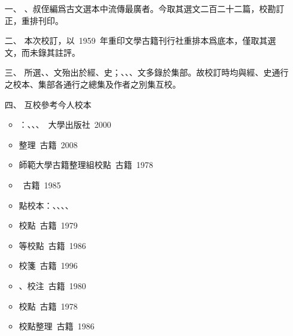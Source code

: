 \begin{enumerate}
    \item[一、] 、叔侄編爲古文選本中流傳最廣者。今取其選文二百二十二篇，校勘訂正，重排刊印。
    \item[二、] 本次校訂，以\ 1959\ 年重印文學古籍刊行社重排本爲底本，僅取其選文，而未錄其註評。
    \item[三、] 所選、、文殆出於經、史；、、、文多錄於集部。故校訂時均與經、史通行之校本、集部各通行之總集及作者之別集互校。
    \item[四、] 互校參考今人校本
    \begin{itemize}
        \item {}：、、、\ {\small {}大學出版社\ 2000}
        \item {}整理\ {\small {}古籍\ 2008}
        \item {}師範大學古籍整理組校點\ {\small {}古籍\ 1978}
        \item {}\ {\small {}古籍\ 1985}
        \item {}點校本：、、、、
        \item {}校點\ {\small {}古籍\ 1979}
        \item {}等校點\ {\small {}古籍\ 1986}
        \item {}校箋\ {\small {}古籍\ 1996}
        \item {}、校注\ {\small {}古籍\ 1980}
        \item {}校點\ {\small {}古籍\ 1978}
        \item {}校點整理\ {\small {}古籍\ 1986}

\end{itemize}
\end{enumerate}
